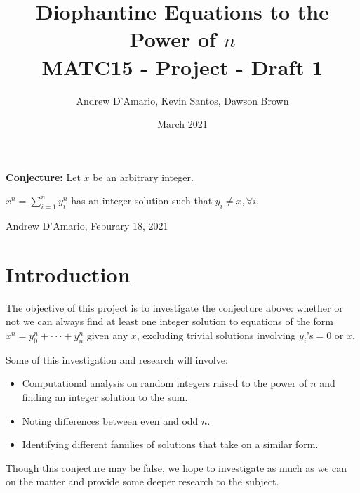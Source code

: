 \documentclass{article}
\title{Diophantine Equations to the Power of $n$ \\ \vspace{.3in} \large{MATC15 - Project - Draft 1}}
\author{Andrew D'Amario, Kevin Santos, Dawson Brown }
\date{March 2021}
\begin{document}
\maketitle

\begin{flushleft}
    {\bf Conjecture:} Let $x$ be an arbitrary integer.

    \hspace{.5in}$\displaystyle x^n=\sum^{n}_{i=1}y_i^n$ has an integer solution such that $y_i\ne x, \forall i$.

    \hspace{2in} Andrew D'Amario, Feburary 18, 2021
\end{flushleft}

\section{Introduction}
The objective of this project is to investigate the conjecture above: whether or not we can always find at least one integer solution to equations of the form $x^n=y_0^n+\cdot\cdot\cdot+y_n^n$ given any $x$, excluding trivial solutions involving $y_i$'s$=0$ or $x$. 

Some of this investigation and research will involve:
\begin{itemize}
    \item Computational analysis on random integers raised to the power of $n$ and finding an integer solution to the sum.
    \item Noting differences between even and odd $n$.
    \item Identifying different families of solutions that take on a similar form.
\end{itemize}

Though this conjecture may be false, we hope to investigate as much as we can on the matter and provide some deeper research to the subject.



\end{document}
